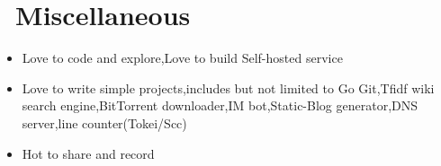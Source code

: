 \documentclass{resume}
\newcommand{\en}[1]{#1}
\newcommand{\zh}[1]{}
\begin{document}
\section{\faInfo\ \en{Miscellaneous}\zh{杂项}}
\begin{itemize}[parsep=0.5ex]
      \item \en{Love to code and explore,Love to build Self-hosted service}
            \zh{喜欢折腾和探索,喜欢搭建 Self-hosted 服务}
      \item \en{Love to write simple projects,includes but not limited to Go Git,Tfidf wiki search engine,BitTorrent downloader,IM bot,Static-Blog generator,DNS server,line counter(Tokei/Scc)}
            \zh{喜欢实现有意思的 Idea,包括但不限于 Go Git、Tfidf wiki 搜索引擎、BitTorrent downloader、IM bot、Static-Blog generator、line counter(Tokei/Scc)、Proxy、Serverless Framework 等等}
      \item \en{Hot to share and record}
            \zh{热爱分享和记录}
\end{itemize}
\end{document}
